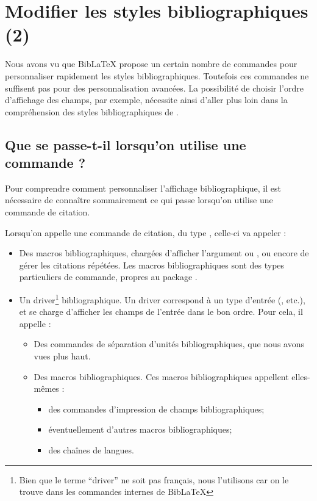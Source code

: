 \chapter{Modifier les styles bibliographiques (2)}


\begin{intro}
    Nous avons vu que BibLaTeX propose un certain nombre de commandes pour personnaliser rapidement les styles bibliographiques. Toutefois  ces commandes ne suffisent pas pour des personnalisation avancées. 
    La possibilité de choisir l'ordre d'affichage des champs, par exemple, nécessite ainsi d'aller plus loin dans la compréhension des styles bibliographiques de .
\end{intro}



\section{Que se passe-t-il lorsqu'on utilise une commande  ?}

Pour comprendre comment personnaliser l'affichage bibliographique, il est nécessaire de connaître sommairement ce qui passe lorsqu'on utilise une commande de citation. 


Lorsqu'on appelle une commande de citation, du type , celle-ci va appeler :
    \begin{itemize}
        \item Des macros bibliographiques, chargées d'afficher l'argument  ou , ou encore de gérer les citations répétées. Les macros bibliographiques sont des types particuliers de commande, propres au package .\label{macrobiblio} 
        \item Un driver\footnote{Bien que le terme \enquote{driver} ne soit pas français, nous l'utilisons car on le trouve dans les commandes internes de BibLaTeX} bibliographique. Un driver correspond à un type d'entrée (,  etc.), et se charge d'afficher les champs de l'entrée dans le bon ordre. Pour cela, il appelle :
        \begin{itemize}
            \item Des commandes de séparation d'unités bibliographiques, que nous avons vues plus haut.
            \item Des macros bibliographiques. Ces macros bibliographiques appellent elles-mêmes :
            \begin{itemize}
                \item des commandes d'impression de champs bibliographiques;
                \item éventuellement d'autres macros bibliographiques;
                \item des chaînes de langues.
            \end{itemize}
        \end{itemize}
        
    \end{itemize}

